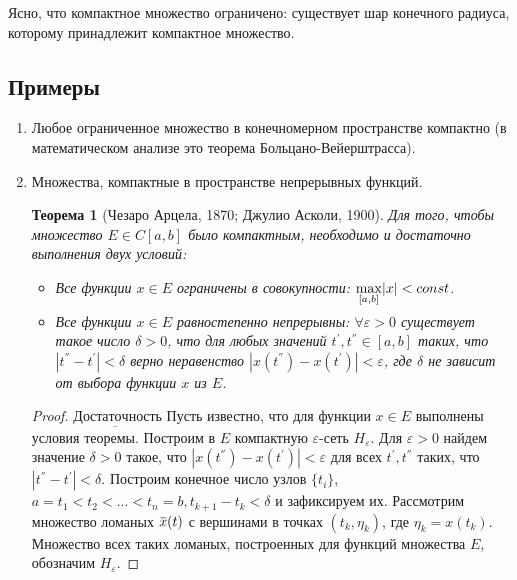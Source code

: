 \documentclass[12pt,a4paper,titlepage, oneside]{book}
\newcommand{\overbar}[1]{\mkern 1.5mu\overline{\mkern-1.5mu#1\mkern-1.5mu}\mkern 1.5mu}
\theoremstyle{definition}
\theoremstyle{plain}
\newtheorem*{theorem}{Теорема}
\theoremstyle{remark}
\theoremstyle{remark}
\theoremstyle{remark}
\theoremstyle{remark}
\theoremstyle{plain}
\theoremstyle{plain}
\begin{document}
Ясно, что компактное множество ограничено: существует шар конечного радиуса, которому принадлежит компактное множество.

\subsection*{Примеры}
\begin{enumerate}

	\item Любое ограниченное множество в конечномерном пространстве компактно (в математическом анализе это теорема Больцано-Вейерштрасса).

	\item Множества, компактные в пространстве непрерывных функций.

\begin{theorem} [Чезаро Арцела, 1870; Джулио Асколи, 1900]
Для того, чтобы множество $E \in C[a, b]$ было компактным, необходимо и достаточно выполнения двух условий:

\begin{itemize}

	\item  Все функции $x\in E$ ограничены в совокупности: $\smash{\displaystyle\max_{ [a,b]}} |x| < const$.

	\item  Все функции $x\in E$ равностепенно непрерывны: $\forall \varepsilon>0$ существует такое число $\delta>0$, что для любых значений $t^{'}, t^{''} \in [a, b]$ таких, что $|t^{''}-t^{'}| <\delta$ верно неравенство $|x(t^{''})-x(t^{'})| <\varepsilon$, где $\delta$ не зависит от выбора функции $x$ из $E$.
	
\end{itemize}

\end{theorem}
\begin{proof} 
	$\underbar{Достаточность}$ Пусть известно, что для функции $x\in E$ выполнены условия теоремы. Построим в $E$ компактную 	$\varepsilon$-сеть $H_{\varepsilon}$. Для 	$ \varepsilon>0$ найдем значение $\delta>0$ такое, что $|x(t^{''})-x(t^{'})| <\varepsilon$ для всех $t^{'}, t^{''}$ таких, что $|t^{''}-t^{'}| <\delta$. Построим конечное число узлов $\{t_i\}$, $a=t_1<t_2<...<t_n=b, t_{k+1}-t_k< \delta$ и зафиксируем их. Рассмотрим множество ломаных $\overbar{x}(t)$ с вершинами в точках $(t_k, \eta_k )$, где $\eta_k=x(t_k)$. Множество всех таких ломаных, построенных для функций множества $E$, обозначим $H_{\varepsilon}$.
	

\end{proof}
\end{enumerate}
\end{document}
